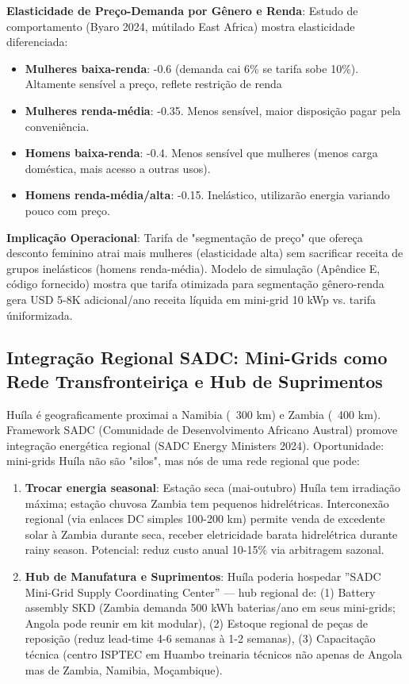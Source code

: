 \documentclass[12pt, a4paper]{article}
\begin{document}
{{{{{{{{{{{{\textbf{Elasticidade de Preço-Demanda por Gênero e Renda}: Estudo de comportamento (Byaro 2024, mútilado East Africa) mostra elasticidade diferenciada:
\begin{itemize}
\item \textbf{Mulheres baixa-renda}: -0.6 (demanda cai 6\% se tarifa sobe 10\%). Altamente sensível a preço, reflete restrição de renda
\item \textbf{Mulheres renda-média}: -0.35. Menos sensível, maior disposição pagar pela conveniência.
\item \textbf{Homens baixa-renda}: -0.4. Menos sensível que mulheres (menos carga doméstica, mais acesso a outras usos).
\item \textbf{Homens renda-média/alta}: -0.15. Inelástico, utilizarão energia variando pouco com preço.
\end{itemize}

\textbf{Implicação Operacional}: Tarifa de "segmentação de preço" que ofereça desconto feminino atrai mais mulheres (elasticidade alta) sem sacrificar receita de grupos inelásticos (homens renda-média). Modelo de simulação (Apêndice E, código fornecido) mostra que tarifa otimizada para segmentação gênero-renda gera USD 5-8K adicional/ano receita líquida em mini-grid 10 kWp vs. tarifa úniformizada.

\subsection{Integração Regional SADC: Mini-Grids como Rede Transfronteiriça e Hub de Suprimentos}

Huíla é geograficamente proximai a Namibia (~300 km) e Zambia (~400 km). Framework SADC (Comunidade de Desenvolvimento Africano Austral) promove integração energética regional (SADC Energy Ministers 2024). Oportunidade: mini-grids Huíla não são "silos", mas nós de uma rede regional que pode:
\begin{enumerate}
\item \textbf{Trocar energia seasonal}: Estação seca (mai-outubro) Huíla tem irradiação máxima; estação chuvosa Zambia tem pequenos hidrelétricas. Interconexão regional (via enlaces DC simples 100-200 km) permite venda de excedente solar à Zambia durante seca, receber eletricidade barata hidrelétrica durante rainy season. Potencial: reduz custo anual 10-15\% via arbitragem sazonal.

\item \textbf{Hub de Manufatura e Suprimentos}: Huíla poderia hospedar ''SADC Mini-Grid Supply Coordinating Center'' — hub regional de: (1) Battery assembly SKD (Zambia demanda 500 kWh baterias/ano em seus mini-grids; Angola pode reunir em kit modular), (2) Estoque regional de peças de reposição (reduz lead-time 4-6 semanas à 1-2 semanas), (3) Capacitação técnica (centro ISPTEC em Huambo treinaria técnicos não apenas de Angola mas de Zambia, Namibia, Moçambique).


\end{enumerate}}}}}}}}}}}}}
\end{document}
